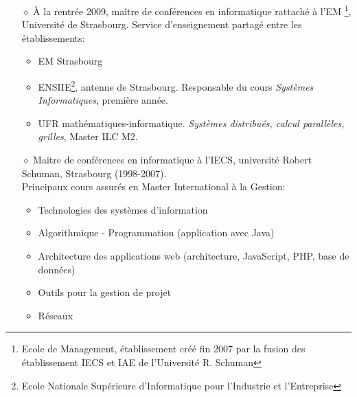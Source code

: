 \begin{itemize}

\item[$\diamond$] \`A la rentrée 2009, maître de conférences en informatique rattaché à l'EM%
\footnote{Ecole de Management, établissement créé fin 2007 par la fusion des établissement IECS et IAE de l'Université R. Schuman}, 
Université de Strasbourg. Service d'enseignement partagé entre les établissements:
\begin{itemize}
	\item EM Strasbourg
	\item ENSIIE\footnote{Ecole Nationale Supérieure d'Informatique pour l'Industrie et l'Entreprise}, antenne de Strasbourg. Responsable du cours \textit{Systèmes Informatiques}, première année.
      \item UFR mathématiques-informatique. \textit{Systèmes distribués, calcul parallèles, grilles}, Master ILC M2. \\[2mm]
\end{itemize}

\item[$\diamond$] Maitre de conférences en informatique à l'IECS, université Robert Schuman, Strasbourg (1998-2007).\\
	Principaux cours assurés en Master International à la Gestion:
\begin{itemize}
	\item Technologies des systèmes d'information
	\item Algorithmique - Programmation (application avec Java)
	\item Architecture des applications web (architecture, JavaScript, PHP, base de données)
	\item Outils pour la gestion de projet
	\item Réseaux \\[2mm]
\end{itemize}


\end{itemize}

